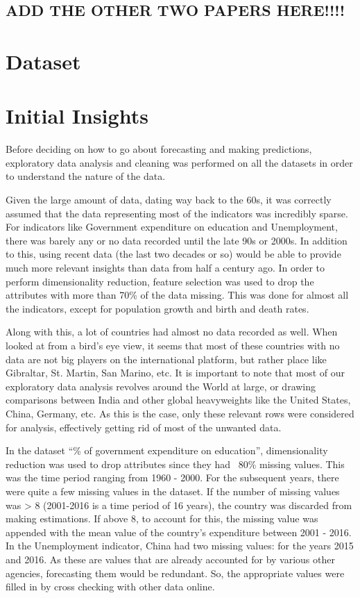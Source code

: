 \documentclass[conference]{IEEEtran}
\begin{document}
\subsection{\textbf{ADD THE OTHER TWO PAPERS HERE!!!!}}

\section{Dataset}


\section{Initial Insights}
Before deciding on how to go about forecasting and making predictions, 
exploratory data analysis and cleaning was performed on all the datasets in order to 
understand the nature of the data. 

Given the large amount of data, dating way back to the 60s, it was correctly assumed that the data representing most of the indicators was incredibly sparse. For indicators like Government expenditure on education and Unemployment, there was barely any or no data recorded until the late 90s or 2000s. In addition to this, using recent data (the last two decades or so) would be able to provide much more relevant insights than data from half a century ago. In order to perform dimensionality reduction, feature selection was used to drop the attributes with more than 
70\% of the data missing. This was done for almost all the indicators, except for population growth and birth and death rates. 

Along with this, a lot of countries had almost no data recorded as well. When looked at from a bird’s eye view, it seems that most of these countries with no data are not big players on the international platform, but rather place like Gibraltar, St. Martin, San Marino, etc. It is important to note that most of our exploratory data analysis revolves around the World at large, or drawing comparisons between India and other global heavyweights like the United States, China, Germany, etc. As this is the case, only these relevant rows were considered for analysis, effectively getting rid of most of the unwanted data.

In the dataset “\% of government expenditure on education”, dimensionality reduction was used to drop attributes since they had ~80\% missing values. This was the time period ranging from 1960 - 2000. For the subsequent years, there were quite a few missing values in the dataset. If the number of missing values was >  8 (2001-2016 is a time period of 16 years), the country was discarded from making estimations. If above 8, to account for this, the missing value was appended with the mean value of the country’s expenditure between 2001 - 2016. 
In the Unemployment indicator, China had two missing values: for the years 2015 and 2016. As these are values that are already accounted for by various other agencies, forecasting them would be redundant. So, the appropriate values were filled in by cross checking with other data online. 
\end{document}
